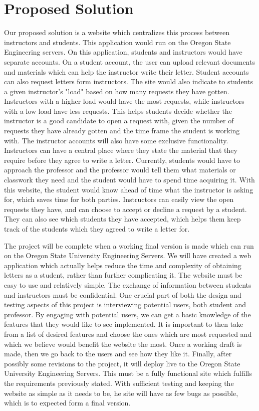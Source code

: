 \documentclass[letterpaper,10pt]{article}
\begin{document}
\section{Proposed Solution}
Our proposed solution is a website which centralizes this process between instructors and students. This application would run on the Oregon State Engineering servers. On this application, students and instructors would have separate accounts. On a student account, the user can upload relevant documents and materials which can help the instructor write their letter. Student accounts can also request letters form instructors. The site would also indicate to students a given instructor's "load" based on how many requests they have gotten. Instructors with a higher load would have the most requests, while instructors with a low load have less requests. This helps students decide whether the instructor is a good candidate to open a request with, given the number of requests they have already gotten and the time frame the student is working with. The instructor accounts will also have some exclusive functionality. Instructors can have a central place where they state the material that they require before they agree to write a letter. Currently, students would have to approach the professor and the professor would tell them what materials or classwork they need and the student would have to spend time acquiring it. With this website, the student would know ahead of time what the instructor is asking for, which saves time for both parties. Instructors can easily view the open requests they have, and can choose to accept or decline a request by a student. They can also see which students they have accepted, which helps them keep track of the students which they agreed to write a letter for.

The project will be complete when a working final version is made which can run on the Oregon State University Engineering Servers. We will have created a web application which actually helps reduce the time and complexity of obtaining letters as a student, rather than further complicating it. The website must be easy to use and relatively simple. The exchange of information between students and instructors must be confidential. One crucial part of both the design and testing aspects of this project is interviewing potential users, both student and professor. By engaging with potential users, we can get a basic knowledge of the features that they would like to see implemented. It is important to then take from a list of desired features and choose the ones which are most requested and which we believe would benefit the website the most. Once a working draft is made, then we go back to the users and see how they like it. Finally, after possibly some revisions to the project, it will deploy live to the Oregon State University Engineering Servers. This must be a fully functional site which fulfills the requirements previously stated. With sufficient testing and keeping the website as simple as it needs to be, he site will have as few bugs as possible, which is to expected form a final version.


\nocite{*}


\end{document}
